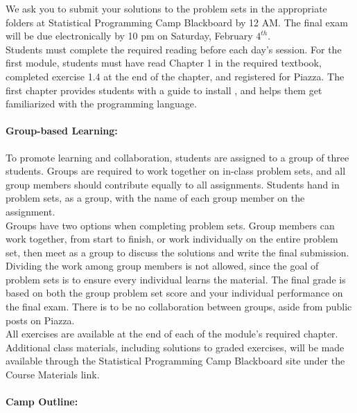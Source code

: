 \documentclass[12pt]{article}
\begin{document}
\noindent We ask you to submit your solutions to the problem sets in
the appropriate folders at Statistical Programming Camp Blackboard by 12 AM.
The final exam will be due electronically by 10 pm on
Saturday, February $4^{th}$. \\

\noindent Students must complete the required reading before each day's session. For the first module, students must have read Chapter 1 in the required textbook, completed exercise 1.4 at the end of the chapter, and registered for Piazza. The first chapter provides students with a guide to install \R, and helps them get familiarized with the programming language.

\paragraph{Group-based Learning:} To promote learning and collaboration, students are assigned to a 
group of three students. Groups are required to work together on
in-class problem  sets, and all group members should contribute
equally to all assignments. Students hand in problem sets, as a group, with the name of each group member on the assignment.\\

\noindent Groups have two options when completing problem sets. Group members can work together, from start to finish, or work individually on the entire problem set, then meet as a group to discuss the solutions and write the final submission. Dividing the work among group members is not allowed, since the goal of problem sets is to ensure every individual learns the material. The final grade is based on both the group problem 
set score and your individual performance on the final exam. There is to be no collaboration between groups, 
aside from public posts on Piazza.\\

\noindent All exercises are available at the end of each of the module's required chapter. Additional class materials, including solutions to graded exercises, will be made available through the Statistical Programming Camp Blackboard 
site under the Course Materials link.%

\paragraph{Camp Outline:}
\end{document}
